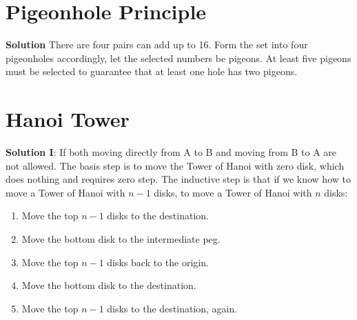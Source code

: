 \documentclass{../../cls/sig-alternate-05-2015}
\begin{document}
\section{Pigeonhole Principle}
\textbf{Solution} There are four pairs can add up to 16. Form the set into four pigeonholes accordingly, let the selected numbers be pigeons. At least five pigeons must be selected to guarantee that at least one hole has two pigeons.

\section{Hanoi Tower}
\textbf{Solution I}:
If both moving directly from A to B and moving from B to A are not allowed.
The basis step is to move the Tower of Hanoi with zero disk,
which does nothing and requires zero step.
The inductive step is that if we know how to move a Tower of Hanoi with $n - 1$ disks, to move a Tower of Hanoi with $n$ disks: \begin{enumerate}
    \item Move the top $n - 1$ disks to the destination.
    \item Move the bottom disk to the intermediate peg.
    \item Move the top $n - 1$ disks back to the origin.
    \item Move the bottom disk to the destination.
    \item Move the top $n - 1$ disks to the destination, again.
\end{enumerate}
\end{document}
